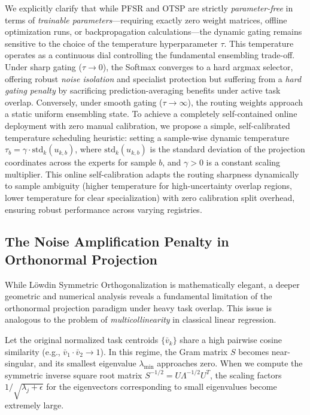 We explicitly clarify that while PFSR and OTSP are strictly \textit{parameter-free} in terms of \textit{trainable parameters}---requiring exactly zero weight matrices, offline optimization runs, or backpropagation calculations---the dynamic gating remains sensitive to the choice of the temperature hyperparameter $\tau$. This temperature operates as a continuous dial controlling the fundamental ensembling trade-off. Under sharp gating ($\tau \to 0$), the Softmax converges to a hard argmax selector, offering robust \textit{noise isolation} and specialist protection but suffering from a \textit{hard gating penalty} by sacrificing prediction-averaging benefits under active task overlap. Conversely, under smooth gating ($\tau \to \infty$), the routing weights approach a static uniform ensembling state. To achieve a completely self-contained online deployment with zero manual calibration, we propose a simple, self-calibrated temperature scheduling heuristic: setting a sample-wise dynamic temperature $\tau_b = \gamma \cdot \text{std}_k(u_{k, b})$, where $\text{std}_k(u_{k,b})$ is the standard deviation of the projection coordinates across the experts for sample $b$, and $\gamma > 0$ is a constant scaling multiplier. This online self-calibration adapts the routing sharpness dynamically to sample ambiguity (higher temperature for high-uncertainty overlap regions, lower temperature for clear specialization) with zero calibration split overhead, ensuring robust performance across varying registries.

\subsection{The Noise Amplification Penalty in Orthonormal Projection}
\label{sec:noise_amplification}
While L{\"o}wdin Symmetric Orthogonalization is mathematically elegant, a deeper geometric and numerical analysis reveals a fundamental limitation of the orthonormal projection paradigm under heavy task overlap. This issue is analogous to the problem of \textit{multicollinearity} in classical linear regression.

Let the original normalized task centroids $\{\bar{v}_k\}$ share a high pairwise cosine similarity (e.g., $\bar{v}_1 \cdot \bar{v}_2 \to 1$). In this regime, the Gram matrix $S$ becomes near-singular, and its smallest eigenvalue $\lambda_{\min}$ approaches zero. When we compute the symmetric inverse square root matrix $S^{-1/2} = U \Lambda^{-1/2} U^T$, the scaling factors $1/\sqrt{\lambda_j + \epsilon}$ for the eigenvectors corresponding to small eigenvalues become extremely large.

